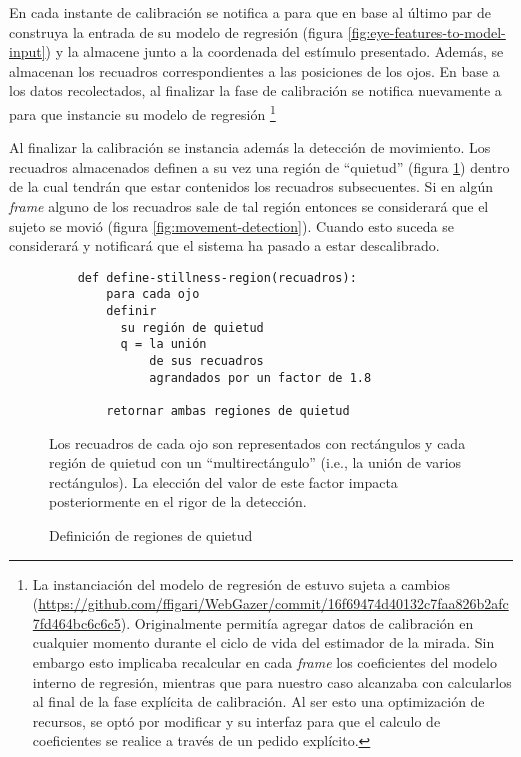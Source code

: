   En cada instante de calibración se notifica a \webgazer para que en base al
  último par de \features construya la entrada de su modelo de regresión
  (figura \ref{fig:eye-features-to-model-input}) y la almacene junto a la
  coordenada del estímulo presentado.
  Además, se almacenan los recuadros correspondientes a las posiciones de los
  ojos.
  En base a los datos recolectados, al finalizar la fase de calibración se
  notifica nuevamente a \webgazer para que instancie su modelo de regresión
  \footnote{
    La instanciación del modelo de regresión de \webgazer estuvo sujeta a
    cambios
    (\url{https://github.com/ffigari/WebGazer/commit/16f69474d40132c7faa826b2afc7fd464bc6c6c5}).
    Originalmente \webgazer permitía agregar datos de calibración en cualquier
    momento durante el ciclo de vida del estimador de la mirada.
    Sin embargo esto implicaba recalcular en cada \textit{frame} los coeficientes
    del modelo interno de regresión, mientras que para nuestro caso alcanzaba con
    calcularlos al final de la fase explícita de calibración.
    Al ser esto una optimización de recursos, se optó por modificar \webgazer y su
    interfaz para que el calculo de coeficientes se realice a través de un pedido
    explícito.
  }

  Al finalizar la calibración se instancia además la detección de movimiento.
  Los recuadros almacenados definen a su vez una región de ``quietud'' (figura
  \ref{fig:features-to-stillnes-region}) dentro de la cual tendrán que estar
  contenidos los recuadros subsecuentes.
  Si en algún \textit{frame} alguno de los recuadros sale de tal región
  entonces se considerará que el sujeto se movió (figura
  \ref{fig:movement-detection}).
  Cuando esto suceda se considerará y notificará que el sistema ha pasado a 
  estar descalibrado.

  \begin{figure}
    \begin{verbatim}
    def define-stillness-region(recuadros):
        para cada ojo
        definir
          su región de quietud
          q = la unión
              de sus recuadros
              agrandados por un factor de 1.8

        retornar ambas regiones de quietud
    \end{verbatim}
    Los recuadros de cada ojo son representados con rectángulos y cada
    región de quietud con un ``multirectángulo'' (i.e., la unión de varios
    rectángulos).
    La elección del valor de este factor impacta posteriormente en el rigor de
    la detección.
    \caption{Definición de regiones de quietud}
    \label{fig:features-to-stillnes-region}
  \end{figure}

